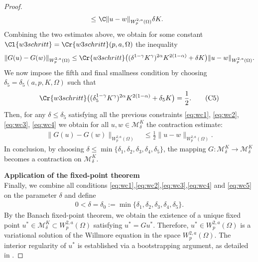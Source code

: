 \documentclass[12pt,a4paper,twoside]{article}
\newcommand{\M}{\mathcal {M}}
\newcommand {\cb}[1] {\tikz[baseline=(char.base)]{
            \node[shape=circle,draw,inner sep=2pt] (char) {\itshape{\textbf{#1}}};}}
\begin{document}
\begin{proof}
\begin{align*}
    \ \le &\ \C  \|u-w \|_{W^{2,a}_p({\Omega})} 
 \delta K.        
\end{align*}
Combining the two estimates above, we obtain for some constant $\Cl{w3schritt}= \Cr{w3schritt}(p,a,\Omega)$  the inequality
\begin{align*}
     \|G (u)-G (w)\|_{W^{2,a}_p(\Omega)}\le \Cr{w3schritt}\big( (\delta^{1-\gamma}K^\gamma)^{2\alpha} K ^{2(1-\alpha)}+ \delta K \big)   \|u-w\|_{W^{2,a}_p(\Omega)}.
\end{align*}
We now impose the fifth and final smallness condition by choosing $\delta_5=\delta_5(a,p,K, \Omega)$  such that
\begin{align}
    \Cr{w3schritt}\big( (\delta_5^{1-\gamma}K^\gamma)^{2\alpha} K ^{2(1-\alpha)} + \delta_5 K \big)   = \frac{1}{2}. \tag{C5} \label{eq:wc5}
\end{align}
Then, for any $\delta \le  \delta_5$ satisfying all the previous constraints \eqref{eq:wc1}, \eqref{eq:wc2}, \eqref{eq:wc3}, \eqref{eq:wc4}  we obtain for all $u,w\in \M^K_\delta$ the contraction estimate:
\begin{align*}
        \|G (u)-G (w)\|_{W^{2,a}_p(\Omega)} &\ \le \frac{1}{2} \|u-w\|_{{W^{2,a}_p(\Omega)}}.
\end{align*}
In conclusion, by choosing $\delta\le \min\{\delta_1, \delta_2, \delta_3, \delta_4,\delta_5\}$,
the mapping $G\colon \M_\delta^K\to \M_\delta^K$ becomes a contraction on $\M_\delta^K $.

\noindent\cb{4} \textbf{ Application of the fixed-point theorem}\\
Finally, we combine all conditions \eqref{eq:wc1},\eqref{eq:wc2},\eqref{eq:wc3},\eqref{eq:wc4} and \eqref{eq:wc5} on the parameter $\delta$ and define
\begin{align}
    0<\delta = \delta_0:= \min\Big\{\delta_1, \delta_2, \delta_3, \delta_4,\delta_5 \Big\}. \label{eq:weightedlpdcond}
\end{align}
By the Banach fixed-point theorem, we obtain the existence of a unique fixed point  $u^\ast\in\M^K_\delta \subset{W^{2,a}_p({\Omega})}$ satisfying
$
	u^\ast=G u^\ast.
$
Therefore,
$u^\ast\in W^{2,a}_p(\Omega)$ is  a variational solution of the Willmore equation in the space $W^{2,a}_p(\Omega)$. 
The interior regularity of $u^\ast$ is established via a bootstrapping argument, as detailed in \cite[Subsection 5.5]{gulyak2024boundary}.
\end{proof}
\end{document}
